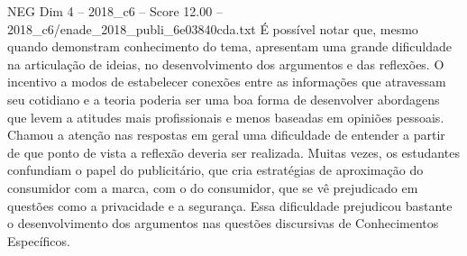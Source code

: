 \begin{textsample}{NEG Dim 4 – 2018\_c6 – Score 12.00 – 2018\_c6/enade\_2018\_publi\_6e03840cda.txt}
É possível notar que, mesmo quando demonstram conhecimento do tema, apresentam uma grande dificuldade na articulação de ideias, no desenvolvimento dos argumentos e das reflexões.
O incentivo a modos de estabelecer conexões entre as informações que atravessam seu cotidiano e a teoria poderia ser uma boa forma de desenvolver abordagens que levem a atitudes mais profissionais e menos baseadas em opiniões pessoais.
Chamou a atenção nas respostas em geral uma dificuldade de entender a partir de que ponto de vista a reflexão deveria ser realizada.
Muitas vezes, os estudantes confundiam o papel do publicitário, que cria estratégias de aproximação do consumidor com a marca, com o do consumidor, que se vê prejudicado em questões como a privacidade e a segurança.
Essa dificuldade prejudicou bastante o desenvolvimento dos argumentos nas questões discursivas de Conhecimentos Específicos.

\end{textsample}
